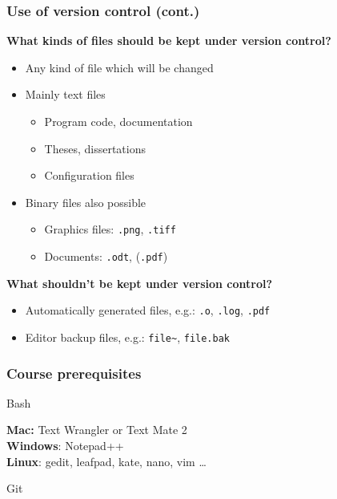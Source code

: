 \documentclass{gittalk}
\begin{document}
\begin{frame}
\frametitle{Use of version control (cont.)}
\textbf{What kinds of files should be kept under version control?}\\[0.5em]
\begin{itemize}
\item Any kind of file which will be changed
\item Mainly text files
    \begin{itemize}
    \item Program code, documentation
    \item Theses, dissertations
    \item Configuration files
    \end{itemize}
\item Binary files also possible
    \begin{itemize}
    \item Graphics files: \texttt{.png}, \texttt{.tiff}
    \item Documents: \texttt{.odt}, (\texttt{.pdf})
    \end{itemize}
\end{itemize}
\vspace*{1em}
\textbf{What shouldn't be kept under version control?}\\[0.5em]
\begin{itemize}
\item Automatically generated files, e.g.: \texttt{.o}, \texttt{.log},
    \texttt{.pdf}
\item Editor backup files, e.g.: \texttt{file\~}, \texttt{file.bak}
\end{itemize}
\end{frame}

\begin{frame}[fragile]
\frametitle{Course prerequisites}
\begin{tcolorbox}
Bash
\end{tcolorbox}
\vspace*{1em}
\begin{tcolorbox}[title=Text editor]
\textbf{Mac:} Text Wrangler or Text Mate 2\\
\textbf{Windows}: Notepad++\\
\textbf{Linux}: gedit, leafpad, kate, nano, vim \dots
\end{tcolorbox}
\vspace*{1em}
\begin{tcolorbox}
Git
\end{tcolorbox}
\end{frame}
\end{document}
